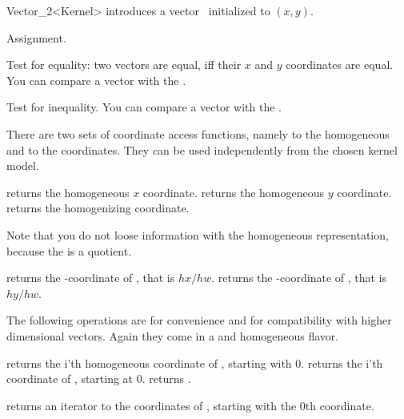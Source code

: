 \begin{ccRefClass} {Vector_2<Kernel>}
            {introduces a vector \ccVar\ initialized to $(x,y)$.}


\ccOperations

\ccHidden {}
        {Assignment.}

       {Test for equality: two vectors are equal, iff their $x$ and $y$ 
        coordinates are equal. You can compare a vector with the
        .}

       {Test for inequality. You can compare a vector with the
        .}

There are two sets of coordinate access functions, namely to the
homogeneous and to the  coordinates. They can be used
independently from the chosen kernel model.

       {returns the homogeneous $x$ coordinate.}
\ccGlue
{}
       {returns the homogeneous $y$ coordinate.}
\ccGlue
{}
       {returns the homogenizing  coordinate.}

Note that you do not loose information with the homogeneous
representation, because the  is a quotient.

       {returns the -coordinate of \ccVar, that is $hx/hw$.}
\ccGlue
{}
       {returns the -coordinate of \ccVar, that is $hy/hw$.}
       
The following operations are for convenience and for compatibility
with higher dimensional vectors.  Again they come in a
 and homogeneous flavor.

       {returns the i'th homogeneous coordinate of \ccVar, starting with 0.
        }
\ccGlue
{}
       {returns the i'th  coordinate of \ccVar, starting at 0.
        }
\ccGlue
{}
       {returns  .
        }

       {returns an iterator to the  coordinates 
        of \ccVar, starting with the 0th coordinate.}


\end{ccRefClass}
